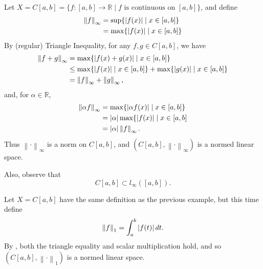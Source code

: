 \documentclass[notoc,notitlepage]{tufte-book}
\newcommand{\norm}[1]{\left\| #1 \right\|}
\begin{document}
\begin{eg}
  Let $X = C[a, b] = \{ f : [a, b] \to \mathbb{R} \mid f \text{ is continuous on } [a, b] \}$, and define
  \begin{align*}
    \norm{f}_\infty &= \sup \{ \abs{f(x)} \mid x \in [a, b] \} \\
                    &= \max \{ \abs{f(x)} \mid x \in [a, b] \}
  \end{align*}
  By (regular) Triangle Inequality, for any $f, g \in C[a, b]$, we have
  \begin{align*}
    \norm{f + g}_\infty &= \max \{ \abs{ f(x) + g(x) } \mid x \in [a, b] \} \\
                        &\leq \max \{ \abs{f(x)} \mid x \in [a, b] \} + \max \{ \abs{g(x)} \mid x \in [a, b] \} \\
                        &= \norm{f}_\infty + \norm{g}_\infty,
  \end{align*}
  and, for $\alpha \in \mathbb{R}$,
  \begin{align*}
    \norm{\alpha f}_\infty &= \max \{ \abs{ \alpha f(x) } \mid x \in [a, b] \} \\
                           &= \abs{\alpha} \max \{ \abs{f(x)} \mid x \in [a, b] \\
                           &= \abs{\alpha} \norm{f}_\infty.
  \end{align*}
  Thus $\norm\cdot_\infty$ is a norm on $C[a, b]$, and $( C[a, b], \norm\cdot_\infty )$ is a normed linear space.

  Also, observe that
  \begin{equation*}
    C[a, b] \subset l_\infty( [a, b] ).
  \end{equation*}
\end{eg}

\begin{eg}
  Let $X = C[a, b]$  have the same definition as the previous example, but this time define
  \begin{equation*}
    \norm{f}_1 = \int_{a}^{b} \abs{ f(t) } \dif{t}.
  \end{equation*}
  By , both the triangle equality and scalar multiplication hold, and so $(C[a, b], \norm\cdot_1)$ is a normed linear space.
\end{eg}
\end{document}
